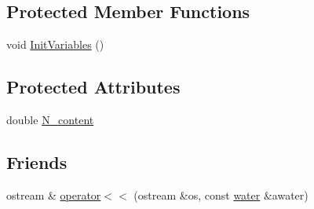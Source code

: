 \subsection*{Protected Member Functions}
\begin{DoxyCompactItemize}
\item 
void \hyperlink{classwater_a43ecfbe5d9e5a62ff43a4273985ae766}{InitVariables} ()
\end{DoxyCompactItemize}
\subsection*{Protected Attributes}
\begin{DoxyCompactItemize}
\item 
double \hyperlink{classwater_a1e8413dfcf679b03f1855e8040e3234a}{N\_\-content}
\end{DoxyCompactItemize}
\subsection*{Friends}
\begin{DoxyCompactItemize}
\item 
ostream \& \hyperlink{classwater_a15586d88be7472f0d54983093d7feec7}{operator$<$$<$} (ostream \&os, const \hyperlink{classwater}{water} \&awater)
\end{DoxyCompactItemize}


